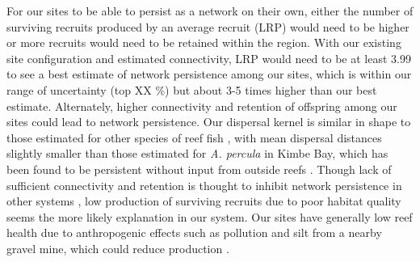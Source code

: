 \documentclass[12pt, oneside]{article}   	%
\begin{document}
For our sites to be able to persist as a network on their own, either the number of surviving recruits produced by an average recruit (LRP) would need to be higher or more recruits would need to be retained within the region. With our existing site configuration and estimated connectivity, LRP would need to be at least 3.99 to see a best estimate of network persistence among our sites, which is within our range of uncertainty (top XX \%) but about 3-5 times higher than our best estimate. Alternately, higher connectivity and retention of offspring among our sites could lead to network persistence. Our dispersal kernel is similar in shape to those estimated for other species of reef fish \citep[e.g.,][]{harrison2012larval, daloia2015patterns}, with mean dispersal distances slightly smaller than those estimated for \textit{A. percula} in Kimbe Bay, which has been found to be persistent without input from outside reefs \citep[13.3 and 18.9 km compared to our estimate of 8.2km][]{salles_coral_2015}. Though lack of sufficient connectivity and retention is thought to inhibit network persistence in other systems \citep[e.g., a collection of reserves for eastern oysters (\textit{Crassostrea virginica}) in the Pamlico Sound in North Carolina][]{puckett2016metapopulation}, low production of surviving recruits due to poor habitat quality seems the more likely explanation in our system. Our sites have generally low reef health due to anthropogenic effects such as pollution and silt from a nearby gravel mine, which could reduce production \citep[as seen in other populations with low habitat quality, e.g.,][]{hayashi2019low}. 

\end{document}
